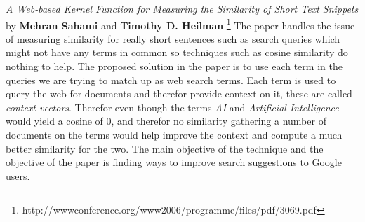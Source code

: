 \textit{A Web-based Kernel Function for Measuring the Similarity of Short Text Snippets} by \textbf{Mehran Sahami} and \textbf{Timothy D. Heilman} \footnote{http://wwwconference.org/www2006/programme/files/pdf/3069.pdf}
\newline
\newline
The paper handles the issue of measuring similarity for really short sentences such as search queries which might not have any terms in common so techniques such as cosine similarity do nothing to help. The proposed solution in the paper is to use each term in the queries we are trying to match up as web search terms. Each term is used to query the web for documents and therefor provide context on it, these are called \textit{context vectors}. Therefor even though the terms \textit{AI} and \textit{Artificial Intelligence} would yield a cosine of 0, and therefor no similarity gathering a number of documents on the terms would help improve the context and compute a much better similarity for the two.
\newline
The main objective of the technique and the objective of the paper is finding ways to improve search suggestions to Google users.